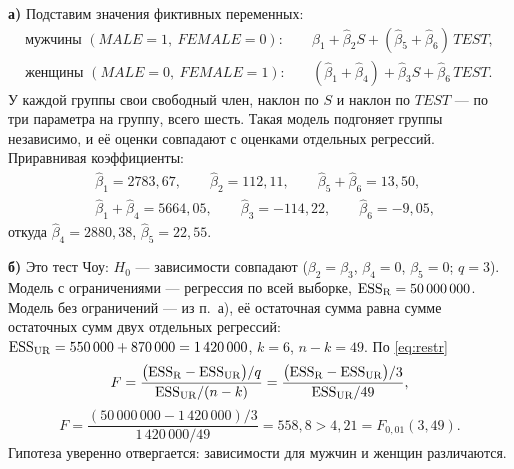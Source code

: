 \begin{solution}
\textbf{а)} Подставим значения фиктивных переменных:
\[
\begin{aligned}
  \text{мужчины } (\mathit{MALE} = 1,\ \mathit{FEMALE} = 0):&\quad
    \widehat{\beta}_1 + \widehat{\beta}_2S + (\widehat{\beta}_5 + \widehat{\beta}_6)\,\mathit{TEST}, \\
  \text{женщины } (\mathit{MALE} = 0,\ \mathit{FEMALE} = 1):&\quad
    (\widehat{\beta}_1 + \widehat{\beta}_4) + \widehat{\beta}_3S + \widehat{\beta}_6\,\mathit{TEST}.
\end{aligned}
\]
У каждой группы свои свободный член, наклон по $S$ и наклон по
$\mathit{TEST}$ — по три параметра на группу, всего шесть. Такая модель
подгоняет группы независимо, и её оценки совпадают с оценками отдельных
регрессий. Приравнивая коэффициенты:
\[
\begin{aligned}
  &\widehat{\beta}_1 = 2783{,}67, \qquad \widehat{\beta}_2 = 112{,}11, \qquad
   \widehat{\beta}_5 + \widehat{\beta}_6 = 13{,}50, \\
  &\widehat{\beta}_1 + \widehat{\beta}_4 = 5664{,}05, \qquad \widehat{\beta}_3 = -114{,}22, \qquad
   \widehat{\beta}_6 = -9{,}05,
\end{aligned}
\]
откуда $\widehat{\beta}_4 = 2880{,}38$, $\widehat{\beta}_5 = 22{,}55$.

\medskip
\textbf{б)} Это тест Чоу: $H_0$ — зависимости совпадают ($\beta_2 = \beta_3$,
$\beta_4 = 0$, $\beta_5 = 0$; $q = 3$). Модель с ограничениями — регрессия по
всей выборке, $\mathrm{ESS}_{\mathrm{R}} = 50\,000\,000$. Модель без ограничений — из
п.~а), её остаточная сумма равна сумме остаточных сумм двух отдельных
регрессий: $\mathrm{ESS}_{\mathrm{UR}} = 550\,000 + 870\,000 = 1\,420\,000$, $k = 6$,
$n - k = 49$. По \eqref{eq:restr}
\[
  F = \frac{\bigl(\mathrm{ESS}_{\mathrm{R}} - \mathrm{ESS}_{\mathrm{UR}}\bigr)/q}
           {\mathrm{ESS}_{\mathrm{UR}}/(n-k)}
    = \frac{\bigl(\mathrm{ESS}_{\mathrm{R}} - \mathrm{ESS}_{\mathrm{UR}}\bigr)/3}
           {\mathrm{ESS}_{\mathrm{UR}}/49},
\]
\[
  F = \frac{(50\,000\,000 - 1\,420\,000)/3}{1\,420\,000/49}
    = 558{,}8 > 4{,}21 = F_{0{,}01}(3, 49).
\]
Гипотеза уверенно отвергается: зависимости для мужчин и женщин различаются.
\end{solution}

\ifsolutions\clearpage\fi
{}


